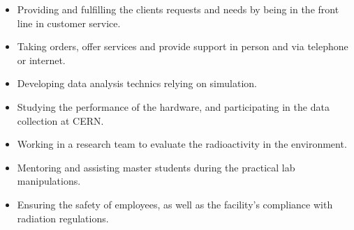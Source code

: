 \documentclass[12pt,a4paper,roman]{moderncv}
\begin{document}

{
    \begin{itemize}
        \item Providing and fulfilling the clients requests and needs by being in the front line in customer service. 
        \item Taking orders, offer services and provide support in person and via telephone or internet.
    \end{itemize}
} %

{
    \begin{itemize}
        \item Developing data analysis technics relying on simulation.
        \item Studying the performance of the hardware, and participating in the data collection at CERN.
    \end{itemize}
} %


{
    \begin{itemize}
        \item Working in a research team to evaluate the radioactivity in the environment.
        \item Mentoring and assisting master students during the practical lab manipulations.
        \item Ensuring the safety of employees, as well as the facility’s compliance with radiation regulations.
    \end{itemize}
} %
\end{document}
